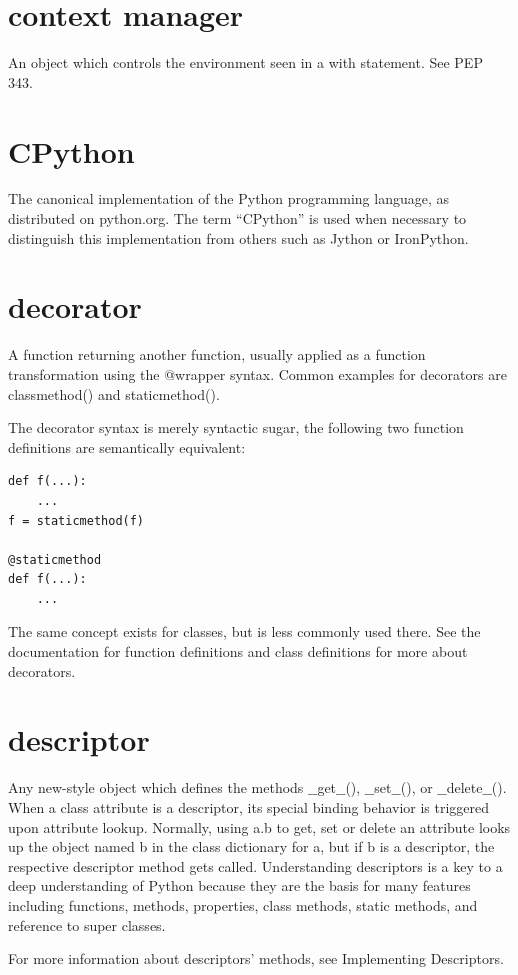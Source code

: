 \documentclass[12pt,a4paper,final,twoside,onecolumn,titlepage]{book}
\begin{document}
\section{context manager}
An object which controls the environment seen in a with statement. See PEP 343.

\section{CPython}
The canonical implementation of the Python programming language, as distributed on python.org. The term “CPython” is used when necessary to distinguish this implementation from others such as Jython or IronPython.

\section{decorator}
A function returning another function, usually applied as a function transformation using the @wrapper syntax. Common examples for decorators are classmethod() and staticmethod().

The decorator syntax is merely syntactic sugar, the following two function definitions are semantically equivalent:
\begin{lstlisting}
def f(...):
    ...
f = staticmethod(f)

@staticmethod
def f(...):
    ...
\end{lstlisting}

The same concept exists for classes, but is less commonly used there. See the documentation for function definitions and class definitions for more about decorators.

\section{descriptor}
Any new-style object which defines the methods $\_\_$get$\_\_$(), $\_\_$set$\_\_$(), or $\_\_$delete$\_\_$(). When a class attribute is a descriptor, its special binding behavior is triggered upon attribute lookup. Normally, using a.b to get, set or delete an attribute looks up the object named b in the class dictionary for a, but if b is a descriptor, the respective descriptor method gets called. Understanding descriptors is a key to a deep understanding of Python because they are the basis for many features including functions, methods, properties, class methods, static methods, and reference to super classes.

For more information about descriptors’ methods, see Implementing Descriptors.
\end{document}
